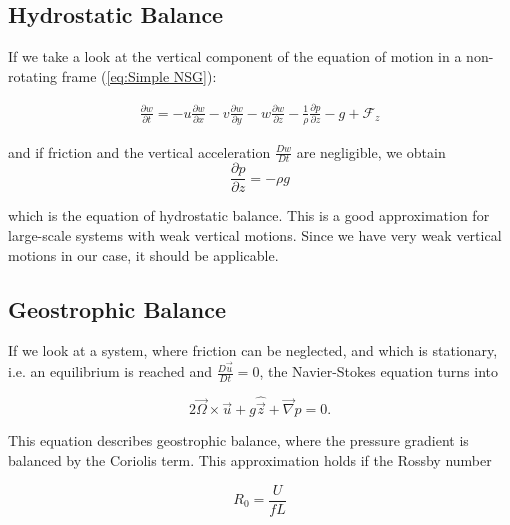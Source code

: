 \documentclass[12pt, a4paper]{article} %
\begin{document}
		
	\subsection{Hydrostatic Balance}
		If we take a look at the vertical component of the equation of motion in a non-rotating frame (\ref{eq:Simple NSG}):
		
		\begin{eqnarray}
		\frac{\partial w}{\partial t} = - u \frac{\partial w}{\partial x} - v \frac{\partial w}{\partial y} - w \frac{\partial w}{\partial z} - \frac{1}{\rho} \frac{\partial p}{\partial z} - g + \mathcal{F}_z
		\label{eq:Simple NSG z}
		\end{eqnarray}
		
		and if friction and the vertical acceleration $\frac{Dw}{Dt}$ are negligible, we obtain
		\begin{equation}
		\frac{\partial p}{\partial z} = -\rho g
		\label{eq:Hydrostat Balance}
		\end{equation}
	
		which is the equation of hydrostatic balance. This is a good approximation for large-scale systems with weak vertical motions. Since we have very weak vertical motions in our case, it should be applicable.
		
	\subsection{Geostrophic Balance} %
		If we look at a system, where friction can be neglected, and which is stationary, i.e. an equilibrium is reached and $\frac{D\vec{u}}{Dt}=0$, the Navier-Stokes equation turns into
		
		\begin{equation}
			2\vec{\Omega} \times \vec{u} +  g\hat{\vec{z}} + \vec{\nabla} p = 0 .
			\label{eq:Geostrophic Balance}
		\end{equation}
		
		This equation describes geostrophic balance, where the pressure gradient is balanced by the Coriolis term. This approximation holds if the Rossby number 
		
		\begin{equation}
			R_0 = \frac{U}{f L}
			\label{eq:Rossby Number}
		\end{equation}
		
\end{document}
